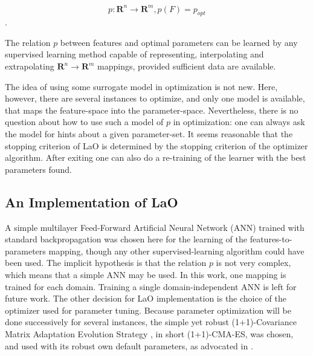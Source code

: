 \documentclass[runningheads,a4paper]{llncs}
\begin{document}
\begin{equation} p: \mathbf{R}^n \to \mathbf{R}^m, p(F)=p_{opt} \end{equation}.	

The relation \begin{math} p \end{math} between features and optimal parameters can be learned by any supervised learning method capable of representing, interpolating and extrapolating  \begin{math}\mathbf{R}^n\to \mathbf{R}^m \end{math} mappings, provided sufficient data are available.

The idea of using some surrogate model in optimization is not new. Here, however, there are  several instances to optimize, and only one model is available, that maps the feature-space into the parameter-space. Nevertheless, there is no question about how to use such a model of \begin{math}p\end{math} in optimization: one can always ask the model for hints about a given parameter-set. It seems reasonable that the stopping criterion of LaO is determined by the stopping criterion of the optimizer algorithm. After exiting one can also do a re-training of the learner with the best parameters found.

\subsection{An Implementation of LaO}

A simple multilayer Feed-Forward Artificial Neural Network (ANN) trained with standard backpropagation was chosen here for the learning of the features-to-parameters mapping, though any other supervised-learning algorithm could have been used. The implicit hypothesis is that the relation \begin{math}p\end{math} is not very complex, which means that a simple ANN may be used. In this work, one mapping is trained for each domain. Training a single domain-independent ANN is left for future work. The other decision for LaO implementation is the choice of the optimizer used for parameter tuning. Because parameter optimization will be done successively for several instances, the simple yet robust (1+1)-Covariance Matrix Adaptation Evolution Strategy \cite{hansen2001ecj}, in short (1+1)-CMA-ES,  was chosen, and used with its robust own default parameters, as advocated in \cite{BibGECCO:2010}.
\end{document}
